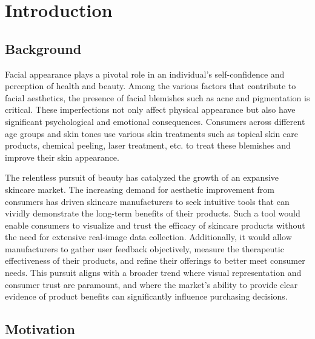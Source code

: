
\chapter{Introduction}
\begin{spacing}{1.5}
\setlength{\parskip}{0.3in}

\section{Background}

Facial appearance plays a pivotal role in an individual's self-confidence and perception of health and beauty. Among the various factors that contribute to facial aesthetics, the presence of facial blemishes such as acne and pigmentation is critical. These imperfections not only affect physical appearance but also have significant psychological and emotional consequences. Consumers across different age groups and skin tones use various skin treatments such as topical skin care products, chemical peeling, laser treatment, etc. to treat these blemishes and improve their skin appearance\cite{doi:10.2352/EI.2023.35.7.IMAGE-276}.

The relentless pursuit of beauty has catalyzed the growth of an expansive skincare market. The increasing demand for aesthetic improvement from consumers has driven skincare manufacturers to seek intuitive tools that can vividly demonstrate the long-term benefits of their products. Such a tool would enable consumers to visualize and trust the efficacy of skincare products without the need for extensive real-image data collection. Additionally, it would allow manufacturers to gather user feedback objectively, measure the therapeutic effectiveness of their products, and refine their offerings to better meet consumer needs. This pursuit aligns with a broader trend where visual representation and consumer trust are paramount, and where the market's ability to provide clear evidence of product benefits can significantly influence purchasing decisions.

\section{Motivation}


\end{spacing}
